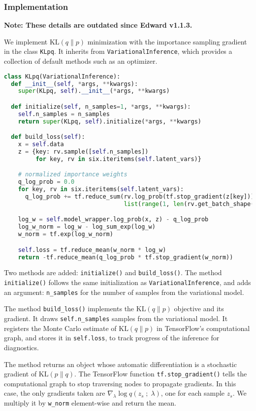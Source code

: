 \subsubsection{Implementation}

\textbf{Note: These details are outdated since Edward v1.1.3.}

We implement $\text{KL}(q\|p)$ minimization with the importance
sampling gradient in the class \texttt{KLpq}. It inherits from
\texttt{VariationalInference}, which provides a collection of default
methods such as an optimizer.

\begin{lstlisting}[language=Python]
class KLpq(VariationalInference):
  def __init__(self, *args, **kwargs):
    super(KLpq, self).__init__(*args, **kwargs)

  def initialize(self, n_samples=1, *args, **kwargs):
    self.n_samples = n_samples
    return super(KLpq, self).initialize(*args, **kwargs)

  def build_loss(self):
    x = self.data
    z = {key: rv.sample([self.n_samples])
         for key, rv in six.iteritems(self.latent_vars)}

    # normalized importance weights
    q_log_prob = 0.0
    for key, rv in six.iteritems(self.latent_vars):
      q_log_prob += tf.reduce_sum(rv.log_prob(tf.stop_gradient(z[key])),
                                  list(range(1, len(rv.get_batch_shape()) + 1)))

    log_w = self.model_wrapper.log_prob(x, z) - q_log_prob
    log_w_norm = log_w - log_sum_exp(log_w)
    w_norm = tf.exp(log_w_norm)

    self.loss = tf.reduce_mean(w_norm * log_w)
    return -tf.reduce_mean(q_log_prob * tf.stop_gradient(w_norm))
\end{lstlisting}

Two methods are added: \texttt{initialize()} and
\texttt{build_loss()}. The method \texttt{initialize()}
follows the same initialization as \texttt{VariationalInference}, and
adds an argument: \texttt{n_samples} for the number of samples from
the variational model.

The method \texttt{build_loss()} implements the $\text{KL}(q\|p)$
objective and its gradient. It draws \texttt{self.n_samples} samples from the
variational model. It registers the Monte Carlo
estimate of $\text{KL}(q\|p)$ in TensorFlow's computational graph, and stores it
in \texttt{self.loss}, to track progress of the inference for diagnostics.

The method returns an object whose
automatic differentiation is a stochastic gradient of $\text{KL}(p\|q)$.
The TensorFlow function \texttt{tf.stop_gradient()} tells the computational
graph to stop traversing nodes to propagate gradients. In this case,
the only gradients taken are $\nabla_\lambda \log q(z_s\;;\;\lambda)$,
one for each sample $z_s$. We multiply it by \texttt{w_norm}
element-wise and return the mean.

